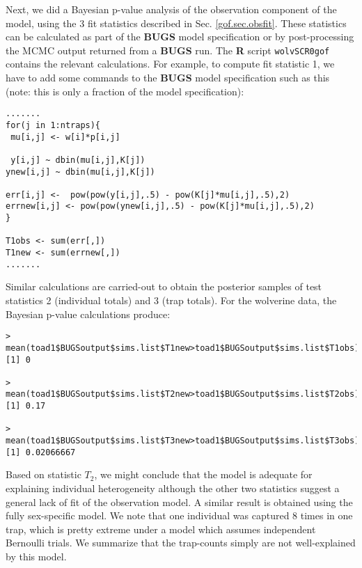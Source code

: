 Next, we did a Bayesian p-value analysis of the observation component
of the model, using the 3 fit statistics
described
in Sec. \ref{gof.sec.obsfit}.
These statistics can be calculated as part of
the {\bf BUGS} model specification or by post-processing the MCMC
output returned from a {\bf BUGS} run.
The {\bf R} script \mbox{\tt wolvSCR0gof} contains the relevant
calculations.  For example, to compute fit statistic 1, we have to add
some commands to the {\bf
  BUGS} model specification such as this (note: this is only a
fraction of the model specification):
\begin{verbatim}
.......
for(j in 1:ntraps){
 mu[i,j] <- w[i]*p[i,j]

 y[i,j] ~ dbin(mu[i,j],K[j])
ynew[i,j] ~ dbin(mu[i,j],K[j])

err[i,j] <-  pow(pow(y[i,j],.5) - pow(K[j]*mu[i,j],.5),2)
errnew[i,j] <- pow(pow(ynew[i,j],.5) - pow(K[j]*mu[i,j],.5),2)
}

T1obs <- sum(err[,])
T1new <- sum(errnew[,])
.......
\end{verbatim}
Similar calculations are carried-out to obtain the posterior samples
of test statistics 2 (individual totals) and 3 (trap totals). For the
wolverine data, the Bayesian p-value calculations produce:
{\small
\begin{verbatim}
> mean(toad1$BUGSoutput$sims.list$T1new>toad1$BUGSoutput$sims.list$T1obs)
[1] 0

> mean(toad1$BUGSoutput$sims.list$T2new>toad1$BUGSoutput$sims.list$T2obs)
[1] 0.17

> mean(toad1$BUGSoutput$sims.list$T3new>toad1$BUGSoutput$sims.list$T3obs)
[1] 0.02066667
\end{verbatim}
}
Based on statistic  $T_2$, we might conclude that the model
is adequate for explaining individual heterogeneity although the other
two statistics 
 suggest a general lack of fit of the observation model.
A similar result is obtained using the fully sex-specific
model.
We 
note that one individual was captured 8 times in one trap, which is
pretty extreme under a model which assumes independent Bernoulli
trials. We summarize that the trap-counts simply are not
well-explained by this model.

\begin{comment}
This produces:
\begin{verbatim}
fully sex-specific model:
>  mean(toad4$BUGSoutput$sims.list$T1new>toad4$BUGSoutput$sims.list$T1obs)
[1] 0
>  mean(toad4$BUGSoutput$sims.list$T2new>toad4$BUGSoutput$sims.list$T2obs)
[1] 0.234
>  mean(toad4$BUGSoutput$sims.list$T3new>toad4$BUGSoutput$sims.list$T3obs)
[1] 0.02133333
\end{verbatim}
which doesn't improve fit very much at all.
\end{comment}

